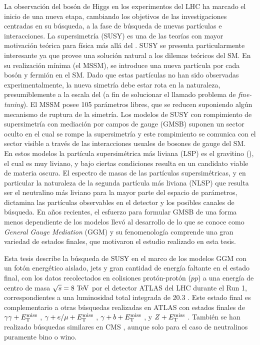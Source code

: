 La observación del bosón de Higgs en los experimentos del LHC ha marcado el inicio de una
nueva etapa, cambiando los objetivos de las investigaciones centradas en su búsqueda, a la
fase de búsqueda de nuevas partículas e interacciones.
La supersimetría (SUSY)
\cite{Miyazawa:1966,Ramond:1971gb,Golfand:1971iw,Neveu:1971rx,Neveu:1971iv,Gervais:1971ji,Volkov:1973ix,Wess:1973kz,Wess:1974tw}
es una de las teorías con mayor motivación teórica para física más allá del
{\SM}. SUSY se presenta particularmente interesante ya que provee una
solución natural a los dilemas teóricos del SM.
En su realización mínima (el MSSM), se introduce
una nueva partícula por cada bosón y fermión en el SM. Dado que
estas partículas no han sido observadas experimentalmente, la nueva simetría debe
estar rota en la naturaleza, presumiblemente a la escala del {\tev} (a fin de solucionar el
llamado problema de \emph{fine-tuning}). El MSSM posee
105 parámetros libres, que se reducen suponiendo algún mecanismo de ruptura de la simetría.
Los modelos de SUSY con rompimiento de supersimetría con
mediación por campos de gauge (GMSB)
\cite{Dine:1981gu,AlvarezGaume:1981wy,Nappi:1982hm,Dine:1993yw,Dine:1994vc,Dine:1995ag}
suponen un sector oculto en el cual se rompe la supersimetría y este rompimiento
se comunica con el sector visible a través de las interacciones
usuales de bosones de gauge del SM. En estos modelos la partícula supersimétrica más liviana
(LSP) es el gravitino (\gravino), el cual es muy liviano, y
bajo ciertas condiciones resulta en un candidato viable de materia oscura. El
espectro de masas de las partículas supersimétricas, y en particular
la naturaleza de la segunda partícula más liviana (NLSP) que resulta ser el
neutralino más liviano {\ninoone} para la mayor parte del espacio de parámetros,
dictamina las partículas observables en el detector y los posibles canales
de búsqueda.
En a\~nos recientes, el esfuerzo para formular GMSB de una
forma menos dependiente de los modelos llevó al desarrollo de lo que se conoce
como \emph{General Gauge Mediation} (GGM) \cite{GGM} y su fenomenología comprende
una gran variedad de estados finales, que motivaron el estudio realizado en esta
tesis.

Esta tesis describe la búsqueda de SUSY en el marco de los modelos GGM con
un fotón energético aislado, jets
y gran cantidad de energía faltante en el estado final, con los datos recolectados en colisiones
protón-protón ($pp$)
a una energía de centro de masa $\sqrt{s} = 8 \tev$ por el detector
ATLAS del LHC durante el Run 1, correspondientes a una luminosidad total
integrada de 20.3 \ifb. Este estado final es complementario a otras búsquedas
realizadas en ATLAS con estados finales de $\gamma\gamma+E_{\mathrm{T}}^{\mathrm{miss}}$ \cite{Aad2012519,ATLAS-CONF-2014-001},
$\gamma+e/\mu+E_{\mathrm{T}}^{\mathrm{miss}}$ \cite{ATLAS-CONF-2012-144}, $\gamma+b+E_{\mathrm{T}}^{\mathrm{miss}}$
\cite{Aad:2012jva}, y $Z+E_{\mathrm{T}}^{\mathrm{miss}}$ \cite{ATLAS-CONF-2012-152}.
También se han realizado búsquedas similares en CMS \cite{CMS-PAS-SUS-12-018,CMS-PAS-SUS-14-004},
aunque solo para el caso de neutralinos puramente bino o wino.

